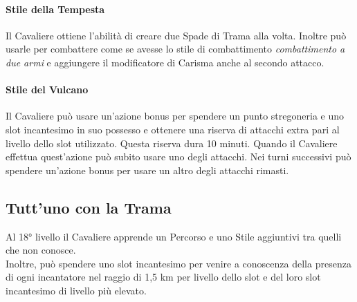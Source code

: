 \paragraph{Stile della Tempesta} Il Cavaliere ottiene l'abilità di creare due Spade di Trama alla volta. Inoltre può usarle per combattere come se avesse lo stile di combattimento \textit{combattimento a due armi} e aggiungere il modificatore di Carisma anche al secondo attacco.
\paragraph{Stile del Vulcano} Il Cavaliere può usare un'azione bonus per spendere un punto stregoneria e uno slot incantesimo in suo possesso e ottenere una riserva di attacchi extra pari al livello dello slot utilizzato. Questa riserva dura 10 minuti. Quando il Cavaliere effettua quest'azione può subito usare uno degli attacchi. Nei turni successivi può spendere un'azione bonus per usare un altro degli attacchi rimasti.

\subsection{Tutt'uno con la Trama}
Al 18° livello il Cavaliere apprende un Percorso e uno Stile aggiuntivi tra quelli che non conosce.
\\ Inoltre, può spendere uno slot incantesimo per venire a conoscenza della presenza di ogni incantatore nel raggio di 1,5 km per livello dello slot e del loro slot incantesimo di livello più elevato.